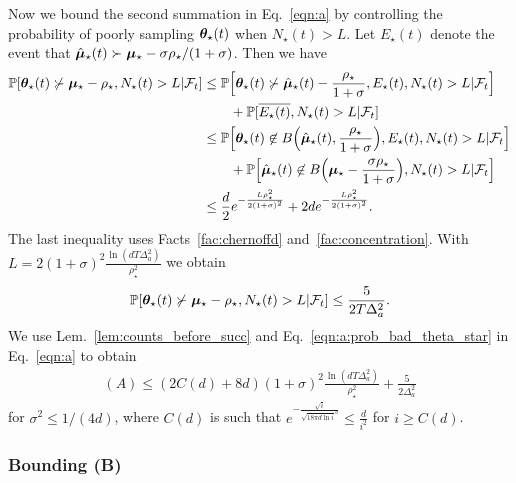 Now we bound the second summation in Eq.~\ref{eqn:a} by controlling the probability of poorly sampling $\boldsymbol{\theta}_\star(t)$ when $N_\star(t) > L$. Let $E_\star(t)$ denote the event that $\hat {\boldsymbol{\mu}}_\star(t) \succ \boldsymbol{\mu}_\star - \sigma \rho_\star / (1 + \sigma)$. Then we have
\begin{align*}
    \mathbb{P}[\boldsymbol{\theta}_\star(t) \not\succ \boldsymbol{\mu}_\star - \rho_\star, N_\star(t) > L | \mathcal{F}_t]
    & \leq \mathbb{P} \Big[ \boldsymbol{\theta}_\star(t) \not\succ \hat {\boldsymbol{\mu}}_\star(t) - \frac{\rho_\star}{1 + \sigma}, E_\star(t), N_\star(t) > L | \mathcal{F}_t \Big] \\
    & \qquad + \mathbb{P}[\overline{E_\star(t)}, N_\star(t) > L | \mathcal{F}_t] \\
    & \leq \mathbb{P} \Big[ \boldsymbol{\theta}_\star(t) \not\in B \Big( \hat {\boldsymbol{\mu}}_\star(t), \frac{\rho_\star}{1 + \sigma} \Big), E_\star(t), N_\star(t) > L | \mathcal{F}_t \Big] \\
    & \qquad + \mathbb{P} \Big[ \hat {\boldsymbol{\mu}}_\star(t) \not\in B \Big( \boldsymbol{\mu}_\star - \frac{\sigma \rho_\star}{1 + \sigma} \Big), N_\star(t) > L | \mathcal{F}_t \Big] \\
    & \leq \frac{d}{2} e^{-\frac{L \rho_\star^2}{2(1 + \sigma)^2}} + 2 d e^{-\frac{L \rho_\star^2}{2(1 + \sigma)^2}}.
\end{align*}
The last inequality uses Facts~\ref{fac:chernoffd} and~\ref{fac:concentration}. With $L = 2 (1 + \sigma)^2 \frac{\ln(d T \Delta_a^2)}{\rho_\star^2}$ we obtain
\begin{align}
\label{eqn:a:prob_bad_theta_star}
    \mathbb{P}[\boldsymbol{\theta}_\star(t) \not\succ \boldsymbol{\mu}_\star - \rho_\star, N_\star(t) > L | \mathcal{F}_t]
    \leq \frac{5}{2 T \Delta_a^2}.
\end{align}
We use Lem.~\ref{lem:counts_before_succ} and Eq.~\ref{eqn:a:prob_bad_theta_star} in Eq.~\ref{eqn:a} to obtain
\begin{align*}
    (A) \leq (2C(d) + 8d) (1 + \sigma)^2 \frac{\ln(d T \Delta_a^2)}{\rho_\star^2} + \frac{5}{2 \Delta_a^2}
\end{align*}
for $\sigma^2 \leq 1/(4d)$, where $C(d)$ is such that $e^{-\frac{\sqrt{i}}{\sqrt{18 \pi d \ln i}^d}} \leq \frac{d}{i^2}$ for $i \geq C(d)$.


\subsubsection{Bounding (B)}

